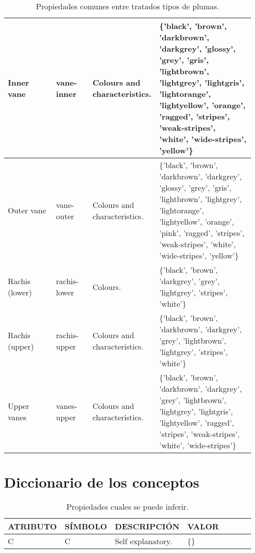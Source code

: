 \documentclass[a4paper,12pt]{article}
\begin{document}
\begin{table}[H]
\begin{tabular}{|p{0.2\linewidth}|p{0.15\linewidth}|p{0.25\linewidth}|p{0.45\linewidth}|}
		Inner vane     & vane-inner   & Colours and characteristics.                  & \{'black', 'brown', 'darkbrown', 'darkgrey', 'glossy', 'grey', 'gris', 'lightbrown', 'lightgrey', 'lightgris', 'lightorange', 'lightyellow', 'orange', 'ragged', 'stripes', 'weak-stripes', 'white', 'wide-stripes', 'yellow'\} \\ \hline
		Outer vane     & vane-outer   & Colours and characteristics.                  & \{'black', 'brown', 'darkbrown', 'darkgrey', 'glossy', 'grey', 'gris', 'lightbrown', 'lightgrey', 'lightorange', 'lightyellow', 'orange', 'pink', 'ragged', 'stripes', 'weak-stripes', 'white', 'wide-stripes', 'yellow'\}      \\ \hline
		Rachis (lower) & rachis-lower & Colours.                                      & \{'black', 'brown', 'darkgrey', 'grey', 'lightgrey', 'stripes', 'white'\}                                                                                                                                                       \\ \hline
		Rachis (upper) & rachis-upper & Colours and characteristics.                  & \{'black', 'brown', 'darkbrown', 'darkgrey', 'grey', 'lightbrown', 'lightgrey', 'stripes', 'white'\}                                                                                                                            \\ \hline
		Upper vanes    & vanes-upper  & Colours and characteristics.                  & \{'black', 'brown', 'darkbrown', 'darkgrey', 'grey', 'lightbrown', 'lightgrey', 'lightgris', 'lightyellow', 'ragged', 'stripes', 'weak-stripes', 'white', 'wide-stripes'\}                                                      \\ \hline
	\end{tabular}
	\caption{Propiedades comunes entre tratados tipos de plumas.}
\end{table}

\section{Diccionario de los conceptos}
\begin{table}[H]
	\centering
	\begin{tabular}{|p{0.2\linewidth}|p{0.15\linewidth}|p{0.25\linewidth}|p{0.4\linewidth}|}
		\hline
		ATRIBUTO & SÍMBOLO & DESCRIPCIÓN       & VALOR \\ \hline\hline
		C        & C       & Self explanatory. & \{\}  \\ \hline
	\end{tabular}
\caption{Propiedades cuales se puede inferir.}
\end{table}
\end{document}
